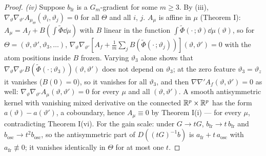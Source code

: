 \begin{proof}
\smallskip
\textit{(iv)} Suppose $b_{\mathrm{fr}}$ is a $G_m$-gradient for some $m\ge3$. By (iii),
$\nabla_\vartheta\nabla_{\vartheta'}A_{\mu_\Theta}(\vartheta_i,\vartheta_j) = 0$ for all $\Theta$ and all $i$, $j$.
$A_\mu$ is affine in $\mu$ (Theorem I): $A_\mu = A_f + B(\int\tilde\Phi\dd\mu)$ with $B$ linear in the function
$\int\tilde\Phi(\cdot\,;\vartheta)\dd\mu(\vartheta)$, so for $\Theta = (\vartheta,\vartheta',\vartheta_3,\dots)$,
$\nabla_\vartheta\nabla_{\vartheta'}[A_f + \frac1m\sum_jB(\tilde\Phi(\cdot\,;\vartheta_j))](\vartheta,\vartheta') = 0$
with the atom positions inside $B$ frozen. Varying $\vartheta_3$ alone shows that
$\nabla_\vartheta\nabla_{\vartheta'}B(\tilde\Phi(\cdot\,;\vartheta_3))(\vartheta,\vartheta')$ does not depend on
$\vartheta_3$; at the zero feature $\vartheta_3 = \vartheta_z$ it vanishes ($B(0) = 0$), so it vanishes for all
$\vartheta_3$, and then $\nabla\nabla'A_f(\vartheta,\vartheta') = 0$ as well:
$\nabla_\vartheta\nabla_{\vartheta'}A_\mu(\vartheta,\vartheta') = 0$ for every $\mu$ and all $(\vartheta,\vartheta')$.
A smooth antisymmetric kernel with vanishing mixed derivative on the connected $\mathbb{R}^p\times\mathbb{R}^p$ has the form
$a(\vartheta) - a(\vartheta')$, a coboundary, hence $A_\mu\equiv0$ by Theorem I(i) --- for every $\mu$, contradicting
Theorem I(vi). For the gain scale: under $G\to tG$, $b_{\mathrm{fr}}\to t\,b_{\mathrm{fr}}$ and
$b_{\mathrm{osc}}\to t^2b_{\mathrm{osc}}$, so the antisymmetric part of $D((tG)^{-1}b)$ is
$a_{\mathrm{fr}} + t\,a_{\mathrm{osc}}$ with $a_{\mathrm{fr}}\not\equiv0$; it vanishes identically in $\Theta$ for at
most one $t$.
\end{proof}

